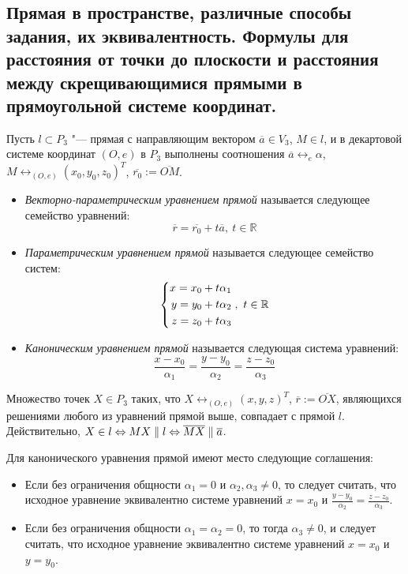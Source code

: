 \subsection{Прямая в пространстве, различные способы задания, их эквивалентность. Формулы для расстояния от точки до плоскости и расстояния между скрещивающимися прямыми в прямоугольной системе координат.}
    
    \begin{definition}
    	Пусть $l \subset P_3$ "--- прямая с направляющим вектором $\overline{a} \in V_3$, $M \in l$, и в декартовой системе координат $(O, e)$ в $P_3$ выполнены соотношения $\overline{a} \leftrightarrow_{e} \alpha$, $M \leftrightarrow_{(O, e)} (x_0, y_0, z_0)^T$, $\overline{r_0} := \overline{OM}$.
    	\begin{itemize}
    		\item \textit{Векторно-параметрическим уравнением прямой} называется следующее семейство уравнений:
    		\[\overline{r} = \overline{r_0} + t\overline{a},~t \in \mathbb{R}\]
    		
    		\item \textit{Параметрическим уравнением прямой} называется следующее семейство систем:
    		\[\left\{
    		\begin{aligned}
    			x = x_0 + t\alpha_1\\
    			y = y_0 + t\alpha_2\\
    			z = z_0 + t\alpha_3
    		\end{aligned}
    		\right.,~t \in \mathbb{R}
    		\]
    		\item \textit{Каноническим уравнением прямой} называется следующая система уравнений:
    		\[\frac{x - x_0}{\alpha_1} = \frac{y - y_0}{\alpha_2} = \frac{z - z_0}{\alpha_3}\]
    	\end{itemize}
    \end{definition}
    
    \begin{note}
    	Множество точек $X \in P_3$ таких, что $X \leftrightarrow_{(O, e)} (x, y, z)^T$, $\overline{r} := \overline{OX}$, являющихся решениями любого из уравнений прямой выше, совпадает с прямой $l$. Действительно, $X \in l \Leftrightarrow MX \parallel l \Leftrightarrow \overline{MX} \parallel \overline{a}$.
    \end{note}
    
    \begin{note}
    	Для канонического уравнения прямой имеют место следующие соглашения:
    	\begin{itemize}
    		\item Если без ограничения общности $\alpha_1 = 0$ и $\alpha_2, \alpha_3 \ne 0$, то следует считать, что исходное уравнение эквивалентно системе уравнений $x = x_0$ и $\frac{y - y_0}{\alpha_2} = \frac{z - z_0}{\alpha_3}$.
    		
    		\item Если без ограничения общности $\alpha_1 = \alpha_2 = 0$, то тогда $\alpha_3 \ne 0$, и следует считать, что исходное уравнение эквивалентно системе уравнений $x = x_0$ и $y = y_0$.
    	\end{itemize}
    \end{note}
    
